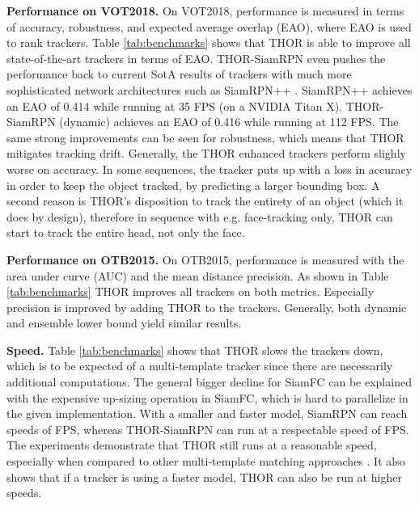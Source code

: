 \documentclass{article}
\begin{document}
\textbf{Performance on VOT2018.}
On VOT2018, performance is measured in terms of accuracy, robustness, and expected average overlap (EAO), where EAO is used to rank trackers. 
Table \ref{tab:benchmarks} shows that THOR is able to improve all state-of-the-art trackers in terms of EAO. THOR-SiamRPN even pushes the performance back to current SotA results of trackers with much more sophisticated network architectures such as SiamRPN++ \cite{li2019siamrpnpp}. SiamRPN++ achieves an EAO of 0.414 while running at 35 FPS (on a NVIDIA Titan X). THOR-SiamRPN (dynamic) achieves an EAO of 0.416 while running at 112 FPS.
The same strong improvements can be seen for robustness, which means that THOR mitigates tracking drift. 
Generally, the THOR enhanced trackers perform slighly worse on accuracy. 
In some sequences, the tracker puts up with a loss in accuracy in order to keep the object tracked, by predicting a larger bounding box. A second reason is THOR's disposition to track the entirety of an object (which it does by design), therefore in sequence with e.g. face-tracking only, THOR can start to track the entire head, not only the face. 

 
\textbf{Performance on OTB2015.}
On OTB2015, performance is measured with the area under curve (AUC) and the mean distance precision. As shown in Table \ref{tab:benchmarks} THOR improves all trackers on both metrics. Especially precision is improved by adding THOR to the trackers. Generally, both dynamic and ensemble lower bound yield similar results.

\textbf{Speed.} 
Table \ref{tab:benchmarks} shows that THOR slows the trackers down, which is to be expected of a multi-template tracker since there are necessarily additional computations. The general bigger decline for SiamFC can be explained with the expensive up-sizing operation in SiamFC, which is hard to parallelize in the given implementation. With a smaller and faster model, SiamRPN can reach speeds of  FPS, whereas THOR-SiamRPN can run at a respectable speed of  FPS. The experiments demonstrate that THOR still runs at a reasonable speed, especially when compared to other multi-template matching approaches \cite{lee2018memory,yang2018learning}. It also shows that if a tracker is using a faster model, THOR can also be run at higher speeds.
\end{document}
